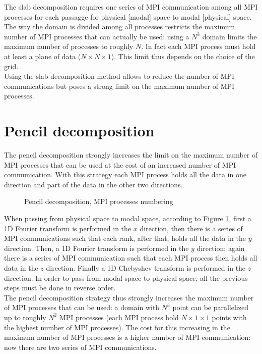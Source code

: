 The slab decomposition requires one series of MPI communication among all MPI processes for each passagge for physical [modal] space to modal [physical] space. The way the domain is divided among all processes restricts the maximum number of MPI processes that can actually be used: using a $N^3$ domain limits the maximum number of processes to roughly $N$. In fact each MPI process must hold at least a plane of data ($N\times N\times 1$). This limit thus depends on the choice of the grid.\\
Using the slab decomposition method allows to reduce the number of MPI communications but poses a strong limit on the maximum number of MPI processes.

\section{Pencil decomposition}
\label{sec: pencil}
The pencil decomposition strongly increases the limit on the maximum number of MPI processes that can be used at the cost of an increased number of MPI communication. With this strategy each MPI process holds all the data in one direction and part of the data in the other two directions.
\begin{figure}[h!]
\centering
\begin{subfigure}{0.45\textwidth}

\end{subfigure}%
\hspace{0.5cm}
\begin{subfigure}{0.45\textwidth}

\end{subfigure}
\caption{Pencil decomposition, MPI processes numbering}
\label{fig: pencil}
\end{figure}
When passing from physical space to modal space, according to Figure \ref{fig: pencil}, first a 1D Fourier transform is performed in the $x$ direction, then there is a series of MPI communications such that each rank, after that, holds all the data in the $y$ direction. Then, a 1D Fourier transform is performed in the $y$ direction; again there is a series of MPI communication such that each MPI process then holds all data in the $z$ direction. Finally a 1D Chebyshev transform is performed in the $z$ direction. In order to pass from modal space to physical space, all the previous steps must be done in reverse order.\\
The pencil decomposition strategy thus strongly increases the maximum number of MPI processes that can be used: a domain with $N^3$ point can be parallelized up to roughly $N^2$ MPI processes (each MPI process hold $N\times1\times1$ points with the highest number of MPI processes). The cost for this increasing in the maximum number of MPI processes is a higher number of MPI communication: now there are two series of MPI communications.\\
